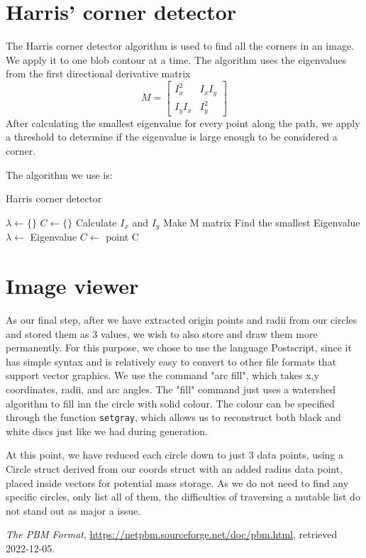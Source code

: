 \documentclass{article}
\begin{document}
	\section{Harris' corner detector}
	The Harris corner detector algorithm is used to find all the corners in an image. We apply it to one blob contour at a time.
	The algorithm uses the eigenvalues from the first directional derivative matrix
	$$
		M = \left[\begin{matrix}
		I_x^2 & I_xI_y \\
		I_yI_x & I_y^2
	\end{matrix}\right]
	$$
	After calculating the smallest eigenvalue for every point along the path, we apply a threshold to determine if the eigenvalue is large enough to be considered a corner.
		
	The algorithm we use is:
	\begin{algorithm}
		\caption{Harris corner detector}
		\begin{algorithmic}
			\State $\lambda \gets \{\}$
			\State $C \gets \{\}$
				\State Calculate $I_x$ and $I_y$
				\State Make M matrix
				\State Find the smallest Eigenvalue
				\State $\lambda \gets$ Eigenvalue
			\EndFor
					\State $C \gets$ point
				\EndIf
			\EndFor
			\State \Return C
		\end{algorithmic}
	\end{algorithm}



	\section{Image viewer}
	As our final step, after we have extracted origin points and radii from our circles and stored them as 3 values, we wish to also store and draw them more permanently.
	For this purpose, we chose to use the language Postscript, since it has simple syntax and is relatively easy to convert to other file formats that support vector graphics.
	We use the command "arc fill", which takes x,y coordinates, radii, and arc angles. The "fill" command just uses a watershed algorithm to fill inn the circle with solid colour. The colour can be specified through the function \texttt{setgray}, which allows us to reconstruct both black and white discs just like we had during generation.
	
	At this point, we have reduced each circle down to just 3 data points, using a Circle struct derived from our coords struct with an added radius data point, placed inside vectors for potential mass storage. As we do not need to find any specific circles, only list all of them, the difficulties of traversing a mutable list do not stand out as major a issue.


\begin{thebibliography}{1}
		
	 \textit{The PBM Format}, \href{url}{https://netpbm.sourceforge.net/doc/pbm.html}, retrieved 2022-12-05.

\end{thebibliography}
\end{document}
